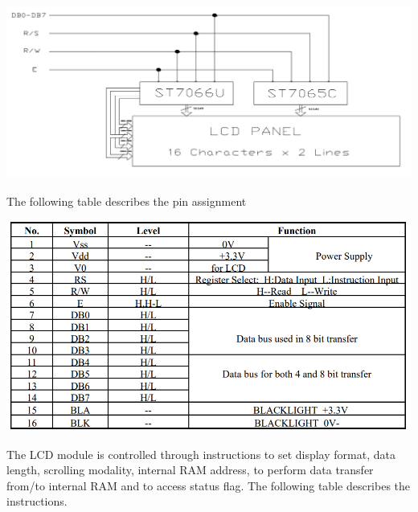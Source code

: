 \documentclass[]{article}
\begin{document}
\begin{center}
    \includegraphics[scale=0.4]{lcd_block_diagram}
\end{center}
The following table describes the pin assignment

\begin{center}
    \includegraphics[scale=0.4]{lcd_pin_assignment}
\end{center}
The LCD module is controlled through instructions to set display format, data length, scrolling modality, internal RAM address, 
to perform data transfer from/to internal RAM and to access status flag. The following table describes the instructions.
\end{document}
